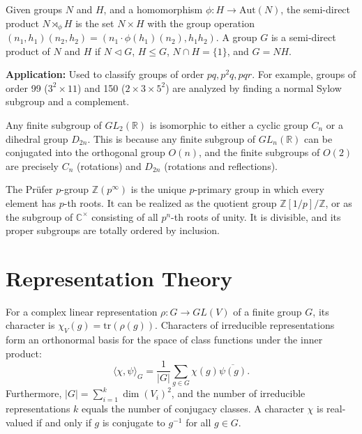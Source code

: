 \begin{definition}
Given groups $N$ and $H$, and a homomorphism $\phi: H \to \mathrm{Aut}(N)$, the semi-direct product $N \rtimes_\phi H$ is the set $N \times H$ with the group operation $(n_1, h_1)(n_2, h_2) = (n_1 \cdot \phi(h_1)(n_2), h_1 h_2)$. 
A group $G$ is a semi-direct product of $N$ and $H$ if $N \triangleleft G$, $H \le G$, $N \cap H = \{1\}$, and $G = NH$. 

\textbf{Application:} Used to classify groups of order $pq, p^2q, pqr$. For example, groups of order 99 ($3^2 \times 11$) and 150 ($2 \times 3 \times 5^2$) are analyzed by finding a normal Sylow subgroup and a complement.
\end{definition}

\begin{remark}
Any finite subgroup of $GL_2(\mathbb{R})$ is isomorphic to either a cyclic group $C_n$ or a dihedral group $D_{2n}$. This is because any finite subgroup of $GL_n(\mathbb{R})$ can be conjugated into the orthogonal group $O(n)$, and the finite subgroups of $O(2)$ are precisely $C_n$ (rotations) and $D_{2n}$ (rotations and reflections).
\end{remark}

\begin{definition}
The Pr\"ufer $p$-group $\mathbb{Z}(p^\infty)$ is the unique $p$-primary group in which every element has $p$-th roots. It can be realized as the quotient group $\mathbb{Z}[1/p] / \mathbb{Z}$, or as the subgroup of $\mathbb{C}^\times$ consisting of all $p^n$-th roots of unity. It is divisible, and its proper subgroups are totally ordered by inclusion.
\end{definition}

\section{Representation Theory}

\begin{definition}
For a complex linear representation $\rho: G \to GL(V)$ of a finite group $G$, its character is $\chi_V(g) = \mathrm{tr}(\rho(g))$. Characters of irreducible representations form an orthonormal basis for the space of class functions under the inner product:
\[ \langle \chi, \psi \rangle_G = \frac{1}{|G|} \sum_{g \in G} \chi(g) \overline{\psi(g)}. \]
Furthermore, $|G| = \sum_{i=1}^k \dim(V_i)^2$, and the number of irreducible representations $k$ equals the number of conjugacy classes. A character $\chi$ is real-valued if and only if $g$ is conjugate to $g^{-1}$ for all $g \in G$.
\end{definition}


